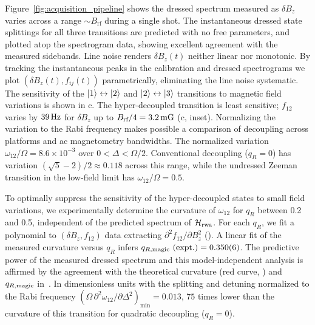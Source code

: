 \documentclass[aps,prl,reprint,superscriptaddress,floatfix]{revtex4-1}
\begin{document}
Figure~\ref{fig:acquisition_pipeline} shows the dressed spectrum measured as $\delta B_z$ varies across a range $\sim B_{\text{rf}}$ during a single shot.
The instantaneous dressed state splittings for all three transitions are predicted with no free parameters, and plotted atop the spectrogram data, showing excellent agreement with the measured sidebands.
Line noise renders $\delta B_z(t)$ neither linear nor monotonic.
By tracking the instantaneous peaks in the calibration and dressed spectrograms we plot $(\delta B_z(t), f_{ij}(t))$ parametrically, eliminating the line noise systematic.
The sensitivity of the $\vert 1 \rangle  \leftrightarrow \vert 2 \rangle $ and $\vert 2 \rangle  \leftrightarrow \vert 3 \rangle $ transitions to magnetic field variations is shown in c.
The hyper-decoupled transition is least sensitive; $f_{12}$ varies by $\unit[39]{Hz}$ for $\delta B_z$ up to $B_{\text{rf}}/4 = \unit[3.2]{mG}$ (c, inset).
Normalizing the variation to the Rabi frequency makes possible a comparison of decoupling across platforms and ac magnetometry bandwidths. 
The normalized variation $\omega_{12}/\Omega = 8.6\times10^{-3}$ over $0<\Delta<\Omega/2$.
Conventional decoupling ($q_R=0$) has variation $(\sqrt{5}-2)/2 \approx 0.118$ across this range, while the undressed Zeeman transition in the low-field limit has $\omega_{12}/\Omega=0.5$.

To optimally suppress the sensitivity of the hyper-decoupled states to small field variations, we experimentally determine the curvature of $\omega_{12}$  for $q_R$ between 0.2 and 0.5, independent of the predicted spectrum of $\mathcal{H}_{\text{rwa}}$.
For each $q_R$, we fit a polynomial to $(\delta B_z, f_{12})$ data extracting $\partial^2 f_{12}/\partial B_z^2$ ().
A linear fit of the measured curvature versus $q_R$ infers $q_{R,\text{magic}}\text{ (expt.)} = 0.350(6)$.
The predictive power of the measured dressed spectrum and this model-independent analysis is affirmed by the agreement with the theoretical curvature (red curve, ) and $q_{R,\text{magic}}$ in~.
In dimensionless units with the splitting and detuning normalized to the Rabi frequency $\left(\Omega\, \partial^2\omega_{12}/\partial \Delta^2\right)_{\text{min}} = 0.013$, $75$ times lower than the curvature of this transition for quadratic decoupling ($q_R = 0$).
\end{document}
